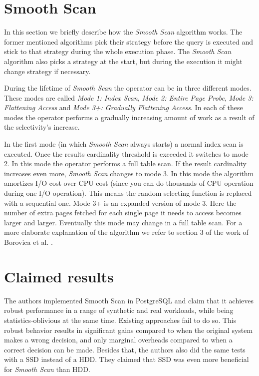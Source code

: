 \documentclass[a4paper,11pt,twoside]{article}
\begin{document}
\section{Smooth Scan}
In this section we briefly describe how the \emph{Smooth Scan} algorithm works. The former mentioned algorithms pick their strategy before the query is executed and stick to that strategy during the whole execution phase. The \emph{Smooth Scan} algorithm also picks a strategy at the start, but during the execution it might change strategy if necessary.

During the lifetime of \emph{Smooth Scan} the operator can be in three different modes. These modes are called \emph{Mode 1: Index Scan}, \emph{Mode 2: Entire Page Probe}, \emph{Mode 3: Flattening Access} and \emph{Mode 3+: Gradually Flattening Access}. In each of these modes the operator performs a gradually increasing amount of work as a result of the selectivity's increase.

In the first mode (in which \emph{Smooth Scan} always starts) a normal index scan is executed. Once the results cardinality threshold is exceeded it switches to mode 2. In this mode the operator performs a full table scan. If the result cardinality increases even more, \emph{Smooth Scan} changes to mode 3. In this mode the algorithm amortizes I/O cost over CPU cost (since you can do thousands of CPU operation during one I/O operation). This means the random selecting function is replaced with a sequential one. Mode 3+ is an expanded version of mode 3. Here the number of extra pages fetched for each single page it needs to access becomes larger and larger. Eventually this mode may change in a full table scan. For a more elaborate explanation of the algorithm we refer to section 3 of the work of Borovica et al. \cite{smoothscan}.

\section{Claimed results}
The authors implemented Smooth Scan in PostgreSQL and claim that it achieves robust performance in a range of synthetic and real workloads, while being statistics-oblivious at the same time. Existing approaches fail to do so. This robust behavior results in significant gains compared to when the original system makes a wrong decision, and only marginal overheads compared to when a correct decision can be made. Besides that, the authors also did the same tests with a SSD instead of a HDD. They claimed that SSD was even more beneficial for \emph{Smooth Scan} than HDD.
\end{document}
